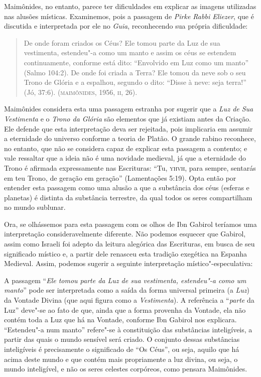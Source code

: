 Maimônides, no entanto, parece ter dificuldades em explicar as
imagens
utilizadas nas alusões místicas. Examinemos, pois a passagem de
\emph{Pirke Rabbi Eliezer}, que é discutida e interpretada por ele
no \emph{Guia}, reconhecendo sua própria dificuldade:

\begin{quote}
De onde foram criados os Céus? Ele tomou parte da Luz de sua
vestimenta, estendeu"-a como um manto e assim os céus se estendem
continuamente, conforme está dito: “Envolvido em Luz como um manto”
(Salmo 104:2). De onde foi criada a Terra? Ele tomou da neve sob o
seu Trono de Glória e a espalhou, segundo o dito: “Disse à neve:
seja
terra!” (Jó, 37:6). (\textsc{maimônides}, 1956, \textsc{ii}, 26).
\end{quote}

Maimônides considera esta uma passagem estranha por sugerir que a
\emph{Luz de Sua Vestimenta} e o \emph{Trono da Glória} são
elementos que já existiam antes da Criação. Ele defende que esta
interpretação deva ser rejeitada, pois implicaria em assumir a
eternidade do universo conforme a teoria de Platão. O grande rabino
reconhece, no entanto, que não se considera capaz de explicar esta
passagem a contento; e vale ressaltar que a ideia não é uma novidade
medieval, já que a eternidade do Trono é afirmada expressamente nas
Escrituras: “Tu, \textsc{yhvh}, para sempre, sentarás em teu Trono, de
geração
em geração” (Lamentações 5:19). Opta então por entender esta
passagem
como uma alusão a que a substância dos céus (esferas e planetas) é
distinta da substância terrestre, da qual todos os seres
compartilham
no mundo sublunar.

Ora, se olhássemos para esta passagem com os olhos de Ibn
Gabirol
teríamos uma interpretação consideravelmente diferente. Não podemos
esquecer que Gabirol, assim como Israeli foi adepto da leitura
alegórica das Escrituras, em busca de seu significado místico e, a
partir dele renasceu esta tradição exegética na Espanha Medieval.
Assim, podemos sugerir a seguinte interpretação
místico"-especulativa:

A passagem “\emph{Ele tomou parte da Luz de sua vestimenta,
estendeu"-a como um manto}” pode ser interpretada como a saída da
forma universal primeira (a \emph{Luz}) da Vontade Divina (que
aqui
figura como a \emph{Vestimenta}). A referência a “\emph{parte}
da
Luz” deve"-se ao fato de que, ainda que a forma provenha da Vontade,
ela não contém toda a Luz que há na Vontade, conforme Ibn Gabirol
nos
explicara. “Estendeu"-a num manto” refere"-se à constituição das
substâncias inteligíveis, a partir das quais o mundo sensível será
criado.  O conjunto dessas substâncias inteligíveis é precisamente o
significado de “Os Céus”, ou seja, aquilo que há acima deste mundo e
que contém mais propriamente a luz divina, ou seja, o mundo
inteligível, e não os seres celestes corpóreos, como pensara
Maimônides.

